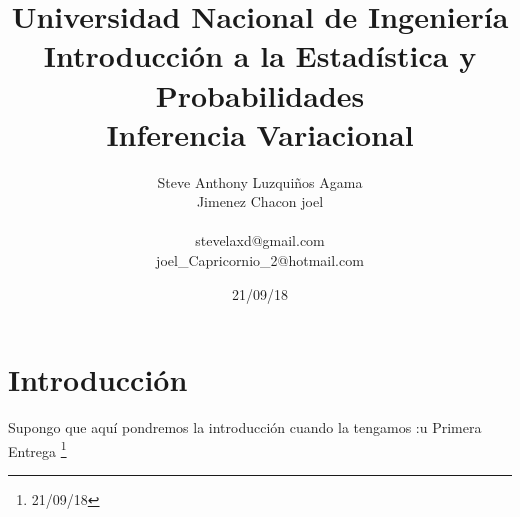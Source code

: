\documentclass[twocolumn]{article}
\begin{document}
\title{Universidad Nacional de Ingeniería\\
Introducción a la Estadística y Probabilidades\\
Inferencia Variacional}
\author{
Steve Anthony Luzquiños Agama\\
Jimenez Chacon joel\\
\\stevelaxd@gmail.com
\\joel\_Capricornio\_2@hotmail.com
}
\date{21/09/18}

\maketitle


\section{Introducción}
Supongo que aquí pondremos la introducción cuando la tengamos :u
\vfill{Primera Entrega} \footnote{21/09/18}
\end{document}
